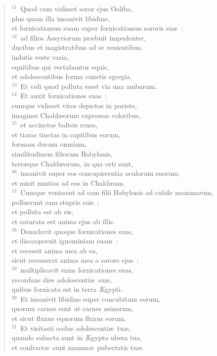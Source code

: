 \begin{flushleft}
\begin{verse}
${}^{11}$~Quod cum vidisset soror ejus Ooliba,\\ plus quam illa insanivit libidine,\\ et fornicationem suam super fornicationem sororis su\ae~:\\
${}^{12}$~ad filios Assyriorum pr\ae buit impudenter,\\ ducibus et magistratibus ad se venientibus,\\ indutis veste varia,\\ equitibus qui vectabantur equis,\\ et adolescentibus forma cunctis egregia.\\
${}^{13}$~Et vidi quod polluta esset via una ambarum.\\
${}^{14}$~Et auxit fornicationes suas~:\\ cumque vidisset viros depictos in pariete,\\ imagines Chald\ae orum expressas coloribus,\\
${}^{15}$~et accinctos balteis renes,\\ et tiaras tinctas in capitibus eorum,\\ formam ducum omnium,\\ similitudinem filiorum Babylonis,\\ terr\ae que Chald\ae orum, in qua orti sunt,\\
${}^{16}$~insanivit super eos concupiscentia oculorum suorum,\\ et misit nuntios ad eos in Chald\ae am.\\
${}^{17}$~Cumque venissent ad eam filii Babylonis ad cubile mammarum,\\ polluerunt eam stupris suis~:\\ et polluta est ab eis,\\ et saturata est anima ejus ab illis.\\
${}^{18}$~Denudavit quoque fornicationes suas,\\ et discooperuit ignominiam suam~:\\ et recessit anima mea ab ea,\\ sicut recesserat anima mea a sorore ejus~:\\
${}^{19}$~multiplicavit enim fornicationes suas,\\ recordans dies adolescenti\ae\ su\ae ,\\ quibus fornicata est in terra \AE gypti.\\
${}^{20}$~Et insanivit libidine super concubitum eorum,\\ quorum carnes sunt ut carnes asinorum,\\ et sicut fluxus equorum fluxus eorum.\\
${}^{21}$~Et visitasti scelus adolescenti\ae\ tu\ae ,\\ quando subacta sunt in \AE gypto ubera tua,\\ et confract\ae\ sunt mamm\ae\ pubertatis tu\ae .\end{verse}\end{flushleft}


